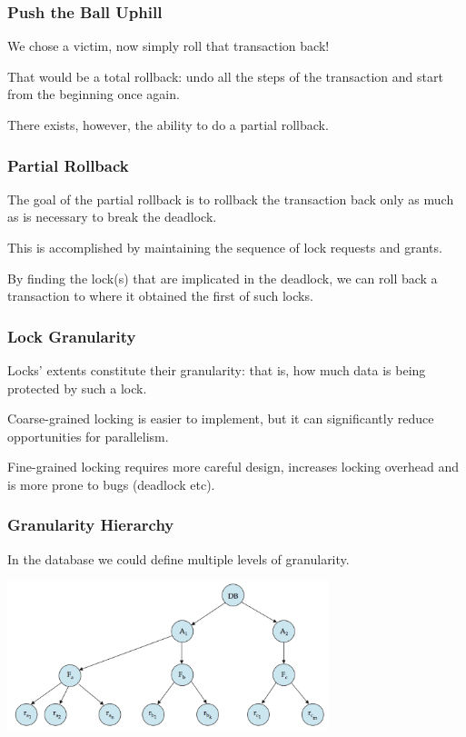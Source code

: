 \begin{frame}
\frametitle{Push the Ball Uphill}

We chose a victim, now simply roll that transaction back! 

That would be a total rollback: undo all the steps of the transaction and start from the beginning once again. 

There exists, however, the ability to do a \alert{partial rollback}. 

\end{frame}

\begin{frame}
\frametitle{Partial Rollback}

The goal of the partial rollback is to rollback the transaction back only as much as is necessary to break the deadlock.  

This is accomplished by maintaining the sequence of lock requests and grants.

 By finding the lock(s) that are implicated in the deadlock, we can roll back a transaction to where it obtained the first of such locks.

\end{frame}



\begin{frame}
\frametitle{Lock Granularity}

Locks' extents constitute their \alert{granularity}: that is, how much data is being protected by such a lock.

\alert{Coarse-grained} locking is easier to implement, but it can significantly reduce opportunities for parallelism. 

\alert{Fine-grained locking} requires more careful design, increases locking overhead and is more prone to bugs (deadlock etc).

 
\end{frame}

\begin{frame}
\frametitle{Granularity Hierarchy}
In the database we could define multiple levels of granularity. 

\begin{center}
\includegraphics[width=0.7\textwidth]{images/granularity-hierarchy}
\end{center}


\end{frame}

